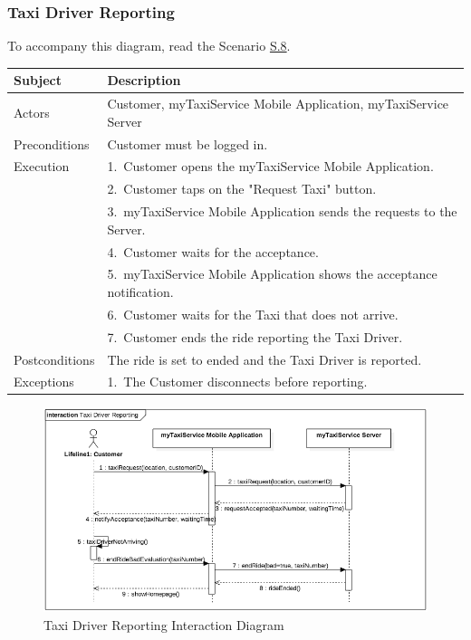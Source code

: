 \subsubsection{Taxi Driver Reporting}
			To accompany this diagram, read the Scenario \hyperref[sec:TaxiDriverReportingScenario]{S.8}.

				\begin{table}[htpb]
					\centering
					\label{tab:TaxiDriverReportingDiagramTable}
					\begin{tabularx}{\textwidth}{lp{9cm}}
						\hline
						\hline
							\textbf{Subject}
						& 
							\textbf{Description}\\
						\hline
							Actors	       &  Customer, myTaxiService Mobile Application, myTaxiService Server\\
						\hline
							Preconditions  &  Customer must be logged in.\\
						\hline
							Execution      &  1.~Customer opens the myTaxiService Mobile Application.\\
										   &  2.~Customer taps on the "Request Taxi" button.\\
										   &  3.~myTaxiService Mobile Application sends the requests to the Server.\\
										   &  4.~Customer waits for the acceptance.\\
										   &  5.~myTaxiService Mobile Application shows the acceptance notification.\\
										   &  6.~Customer waits for the Taxi that does not arrive.\\
										   &  7.~Customer ends the ride reporting the Taxi Driver.\\
						\hline
							Postconditions &  The ride is set to ended and the Taxi Driver is reported.\\
						\hline
							Exceptions     &  1.~The Customer disconnects before reporting.\\
									
						\hline
						\hline
					\end{tabularx}
				\end{table}
				
				\begin{figure}[H]
					\centering
					\includegraphics[width=\textwidth, scale=0.5]{IMG/InteractionDiagrams/TaxiDriverReporting.png}
					\caption{Taxi Driver Reporting Interaction Diagram}\label{sec:FigureTaxiDriverReporting}
				\end{figure}